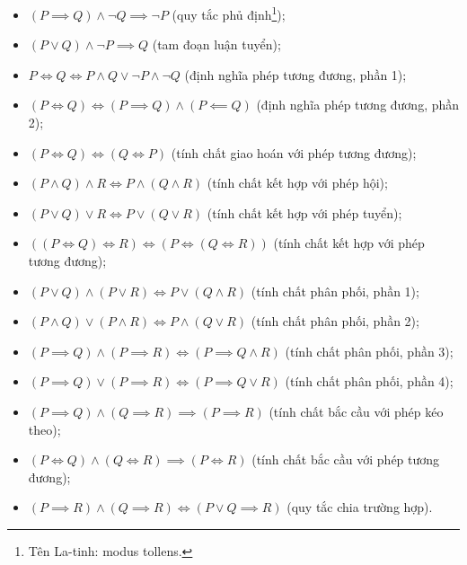 \begin{itemize}
   \item $\left(P \implies Q\right) \land \neg Q \implies \neg P$ (quy tắc phủ định\footnote{Tên La-tinh: modus tollens.});
   \item $\left(P \lor Q\right) \land \neg P \implies Q$ (tam đoạn luận tuyển);
   \item $P \iff Q \iff P \land Q \lor \neg P \land \neg Q$ (định nghĩa phép tương đương, phần 1);
   \item $\left(P \iff Q\right) \iff \left(P \implies Q\right) \land \left(P \impliedby Q\right)$ (định nghĩa phép tương đương, phần 2);
   \item $\left(P \iff Q\right) \iff \left(Q \iff P\right)$ (tính chất giao hoán với phép tương đương);
   \item $\left(P \land Q\right) \land R \iff P \land \left(Q \land R\right)$ (tính chất kết hợp với phép hội);
   \item $\left(P \lor Q\right) \lor R \iff P \lor \left(Q \lor R\right)$ (tính chất kết hợp với phép tuyển);
   \item $\left(\left(P \iff Q\right) \iff R \right) \iff \left(P \iff \left(Q \iff R\right)\right)$ (tính chất kết hợp với phép tương đương);
   \item $\left(P \lor Q\right) \land \left(P \lor R\right) \iff P \lor (Q \land R)$ (tính chất phân phối, phần 1);
   \item $\left(P \land Q\right) \lor \left(P \land R\right) \iff P \land (Q \lor R)$ (tính chất phân phối, phần 2);
   \item $\left(P \implies Q\right) \land \left(P \implies R\right) \iff (P \implies Q \land R)$ (tính chất phân phối, phần 3);
   \item $\left(P \implies Q\right) \lor \left(P \implies R\right) \iff (P \implies Q \lor R)$ (tính chất phân phối, phần 4);
   \item $\left(P \implies Q\right) \land \left(Q \implies R\right) \implies \left(P \implies R\right)$ (tính chất bắc cầu với phép kéo theo);
   \item $\left(P \iff Q\right) \land \left(Q \iff R\right) \implies \left(P \iff R\right)$ (tính chất bắc cầu với phép tương đương);
   \item $\left(P \implies R\right) \land \left(Q \implies R\right) \iff \left(P \lor Q \implies R\right)$ (quy tắc chia trường hợp).
\end{itemize}


